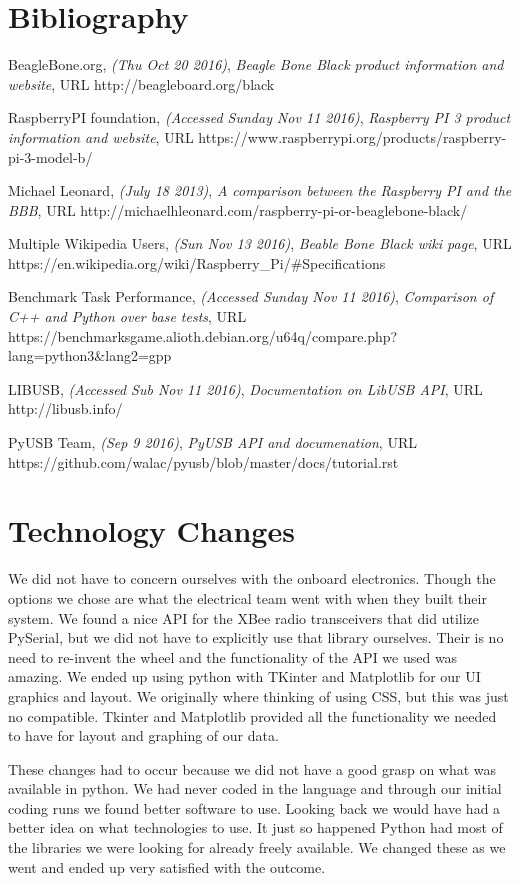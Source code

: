 \documentclass[10pt,draftclsnofoot,onecolumn,retainorgcmds]{IEEEtran}
\begin{document}
\section{Bibliography}
\begin{thebibliography}{9}
	
	BeagleBone.org,
	\emph{(Thu Oct 20 2016)},
	\emph{Beagle Bone Black product information and website},
	URL  http://beagleboard.org/black
	
	RaspberryPI foundation,
	\emph{(Accessed Sunday  Nov 11 2016)},
	\emph{Raspberry PI 3 product information and website},
	URL https://www.raspberrypi.org/products/raspberry-pi-3-model-b/
	
	Michael Leonard,
	\emph{(July 18 2013)},
	\emph{A comparison between the Raspberry PI and the BBB},
	URL  http://michaelhleonard.com/raspberry-pi-or-beaglebone-black/ 
	
	Multiple Wikipedia Users,
	\emph{(Sun Nov 13 2016)},
	\emph{Beable Bone Black wiki page},
	URL https://en.wikipedia.org/wiki/Raspberry\_Pi/\#Specifications 
	
	Benchmark Task Performance,
	\emph{(Accessed Sunday  Nov 11 2016)},
	\emph{Comparison of C++ and Python over base tests},
	URL   https://benchmarksgame.alioth.debian.org/u64q/compare.php?lang=python3\&lang2=gpp  
	
	LIBUSB,
	\emph{(Accessed Sub Nov 11 2016)},
	\emph{Documentation on LibUSB API},
	URL http://libusb.info/
	
	PyUSB Team,
	\emph{(Sep 9 2016)},
	\emph{PyUSB API and documenation},
	URL https://github.com/walac/pyusb/blob/master/docs/tutorial.rst
	
\end{thebibliography}

\section{Technology Changes}
We did not have to concern ourselves with the onboard electronics. Though the options we chose are what the electrical team went with when they built their system. We found a nice API for the XBee radio transceivers that did utilize PySerial, but we did not have to explicitly use that library ourselves. Their is no need to re-invent the wheel and the functionality of the API we used was amazing. We ended up using python with TKinter and Matplotlib for our UI graphics and layout. We originally where thinking of using CSS, but this was just no compatible. Tkinter and Matplotlib provided all the functionality we needed to have for layout and graphing of our data. \par
These changes had to occur because we did not have a good grasp on what was available in python. We had never coded in the language and through our initial coding runs we found better software to use. Looking back we would have had a better idea on what technologies to use. It just so happened Python had most of the libraries we were looking for already freely available. We changed these as we went and ended up very satisfied with the outcome. \par
\end{document}
